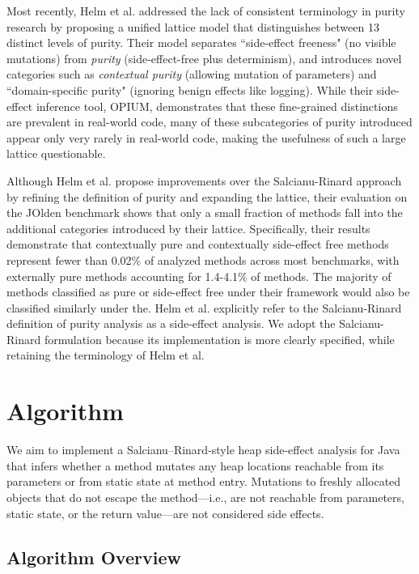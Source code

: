 \documentclass{article}
\begin{document}
Most recently, Helm et al. \cite{helm2018unified} addressed the lack of consistent terminology in purity research by proposing a unified lattice model that distinguishes between 13 distinct levels of purity. Their model separates ``side-effect freeness" (no visible mutations) from \emph{purity} (side-effect-free plus determinism), and introduces novel categories such as \emph{contextual purity} (allowing mutation of parameters) and ``domain-specific purity" (ignoring benign effects like logging). While their side-effect inference tool, OPIUM, demonstrates that these fine-grained distinctions are prevalent in real-world code, many of these subcategories of purity introduced appear only very rarely in real-world code, making the usefulness of such a large lattice questionable.

Although Helm et al. propose improvements over the Salcianu-Rinard approach by refining the definition of purity and expanding the lattice, their evaluation on the JOlden benchmark shows that only a small fraction of methods fall into the additional categories introduced by their lattice. Specifically, their results demonstrate that contextually pure and contextually side-effect free methods represent fewer than 0.02\% of analyzed methods across most benchmarks, with externally pure methods accounting for 1.4-4.1\% of methods. The majority of methods classified as pure or side-effect free under their framework would also be classified similarly under the. Helm et al. explicitly refer to the Salcianu-Rinard definition of purity analysis as a side-effect analysis. We adopt the Salcianu-Rinard formulation because its implementation is more clearly specified, while retaining the terminology of Helm et al. 


\section{Algorithm}

We aim to implement a Salcianu--Rinard-style heap side-effect analysis for Java that infers whether a method mutates any heap locations reachable from its parameters or from static state at method entry. Mutations to freshly allocated objects that do not escape the method—i.e., are not reachable from parameters, static state, or the return value—are not considered side effects.

\subsection{Algorithm Overview}
\end{document}
